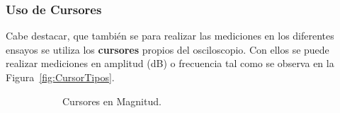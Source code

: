     \subsubsection*{Uso de Cursores}
        
        Cabe destacar, que también se para realizar las mediciones en los diferentes ensayos
        se utiliza los \textbf{cursores} propios del osciloscopio. Con ellos se puede 
        realizar mediciones en amplitud (dB) o frecuencia tal como se observa en la
        Figura~\ref{fig:CursorTipos}.  
            \begin{figure}[H]
                \centering
                \begin{subfigure}[H]{0.45\textwidth}
                \caption{Cursores en Magnitud.}
                \label{fig:CursorMag}
                \end{subfigure}
                \hfill 
                \begin{subfigure}[H]{0.45\textwidth}

\end{subfigure}
\end{figure}
